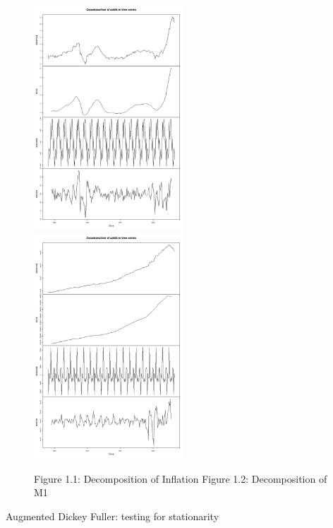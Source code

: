 \documentclass{article}
\newenvironment{myenv}
{
    \color{mydarkblue} %
    \fontsize{9pt}{9pt}\selectfont %

}
{
}
\begin{document}
    \begin{figure}[htbp]
        \includegraphics*[width=0.5\textwidth]{../graphs/Decomposition of Inflation.png}%
        \includegraphics*[width=0.5\textwidth]{../graphs/Decomposition of M1.png}
        \vspace{-\baselineskip}
        \begin{myenv}
            \hspace*{0.1\textwidth}
            Figure 1.1: Decomposition of Inflation \hspace*{0.15\textwidth} 
            Figure 1.2: Decomposition of M1
        \end{myenv}
    \end{figure}
    \vspace*{0.1cm}
    \begin{mdframed}[style=sectionstyle]
        Augmented Dickey Fuller: testing for stationarity
    \end{mdframed}
        
\end{document}
